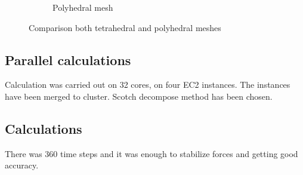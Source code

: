 \begin{figure}[h!]
\begin{subfigure}[b]{0.46\textwidth}
        \caption{Polyhedral mesh}
    \end{subfigure}
    \caption{Comparison both tetrahedral and polyhedral meshes}
\end{figure}


\subsection{Parallel calculations}
Calculation was carried out on 32 cores, on four EC2 instances. The instances have been merged to cluster. Scotch decompose method has been chosen. 

\subsection{Calculations}
There was 360 time steps and it was enough to stabilize forces and getting good accuracy.